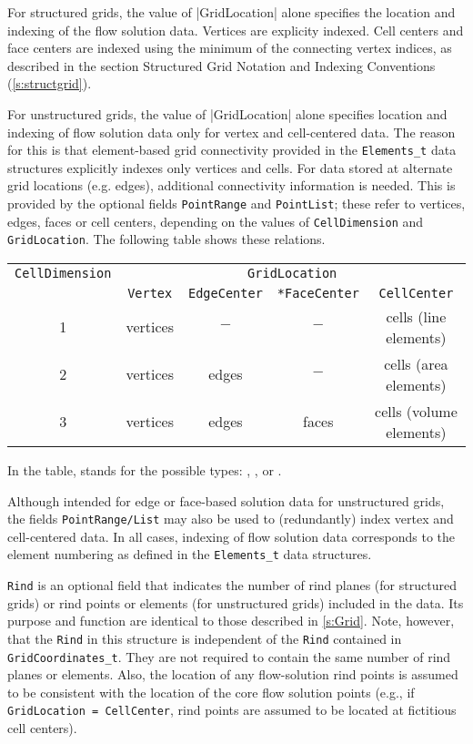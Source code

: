 For structured grids, the value of |GridLocation| alone specifies the location
and indexing of the flow solution data.  Vertices are explicity indexed.  Cell
centers and face centers are indexed using the minimum of the connecting vertex
indices, as described in the section Structured Grid Notation and Indexing
Conventions (\autoref{s:structgrid}).

For unstructured grids, the value of |GridLocation| alone specifies location and
indexing of flow solution data only for vertex and cell-centered data.  The
reason for this is that element-based grid connectivity provided in the
\texttt{Elements\_t} data structures explicitly indexes only vertices and cells.
For data stored at alternate grid locations (e.g. edges), additional
connectivity information is needed.  This is provided by the optional fields
\texttt{PointRange} and \texttt{PointList}; these refer to
vertices, edges, faces or cell centers, depending on the values of
\texttt{CellDimension} and \texttt{GridLocation}.  The following table shows
these relations.

\begin{center}
\begin{tabular}{||c|c|c|c|c||}
 \hline
\texttt{CellDimension} & \multicolumn{4}{c||}{\texttt{GridLocation}} \\
& \texttt{Vertex} & \texttt{EdgeCenter} & \texttt{*FaceCenter} & \texttt{CellCenter} \\
 \hline
1 & vertices & $-$ & $-$ & cells (line elements) \\
2 & vertices & edges & $-$ & cells (area elements) \\
3 & vertices & edges & faces & cells (volume elements) \\
 \hline
\end{tabular}
\end{center}

In the table,  stands for the possible types: ,
,  or .

Although intended for edge or face-based solution data for unstructured grids,
the fields \texttt{PointRange/List} may also be used to (redundantly) index
vertex and cell-centered data.  In all cases, indexing of flow solution data
corresponds to the element numbering as defined in the \texttt{Elements\_t} data
structures.

\texttt{Rind} is an optional field that indicates
the number of rind planes (for structured grids) or rind points or
elements (for unstructured grids) included in the data.
Its purpose and function are identical to those described in
\autoref{s:Grid}.
Note, however, that the \texttt{Rind} in this structure is independent
of the \texttt{Rind} contained in \texttt{GridCoordinates\_t}.
They are not required to contain the same number of rind planes or
elements.
Also, the location of any flow-solution rind points is assumed to be
consistent with the location of the core flow solution points (e.g.,
if \texttt{GridLocation = CellCenter}, rind points are assumed to be
located at fictitious cell centers).

